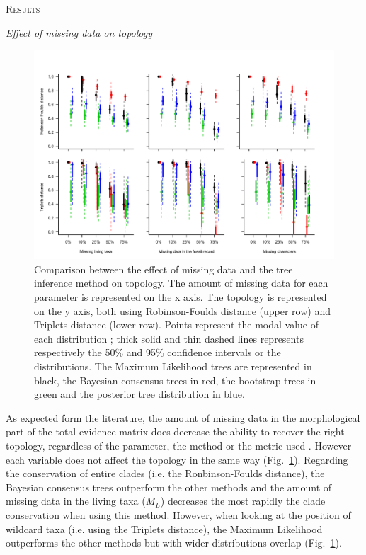 \documentclass[12pt,letterpaper]{article}
\renewcommand{\section}[1]{%
\bigskip
\begin{center}
\begin{Large}
\normalfont\scshape #1
\medskip
\end{Large}
\end{center}}
\renewcommand{\subsection}[1]{%
\bigskip
\begin{center}
\begin{large}
\normalfont\itshape #1
\end{large}
\end{center}}
\begin{document}
\section{Results}

\subsection{Effect of missing data on topology}

\begin{figure} 
\centering
    \includegraphics[width=1\textwidth]{Figures/In_main/AllMethods-RF+Tr-colour.pdf}
\caption{Comparison between the effect of missing data and the tree inference method on topology. The amount of missing data for each parameter is represented on the x axis. The topology is represented on the y axis, both using Robinson-Foulds distance (upper row) and Triplets distance (lower row). Points represent the modal value of each distribution ; thick solid and thin dashed lines represents respectively the 50\% and 95\% confidence intervals or the distributions. The Maximum Likelihood trees are represented in black, the Bayesian consensus trees in red, the bootstrap trees in green and the posterior tree distribution in blue.}
\label{Fig_Results-permeth_perparam} %
\end{figure}

As expected form the literature, the amount of missing data in the morphological part of the total evidence matrix does decrease the ability to recover the right topology, regardless of the parameter, the method or the metric used \citep[e.g.][]{rouresite-specific2011,sansomfossilization2013,pattinsonphylogeny2014}. However each variable does not affect the topology in the same way (Fig.~\ref{Fig_Results-permeth_perparam}). Regarding the conservation of entire clades (i.e. the Ronbinson-Foulds distance), the Bayesian consensus trees outperform the other methods and the amount of missing data in the living taxa ($M_{L}$) decreases the most rapidly the clade conservation when using this method. However, when looking at the position of wildcard taxa (i.e. using the Triplets distance), the Maximum Likelihood outperforms the other methods but with wider distributions overlap (Fig.~\ref{Fig_Results-permeth_perparam}).
\end{document}
